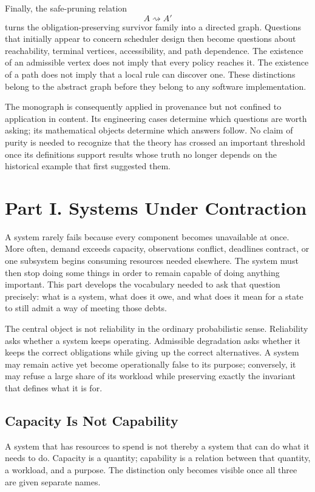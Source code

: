\documentclass[11pt]{report}
\begin{document}
Finally, the safe-pruning relation
\[
A\rightsquigarrow A'
\]
turns the obligation-preserving survivor family into a directed graph.
Questions that initially appear to concern scheduler design then become
questions about reachability, terminal vertices, accessibility, and
path dependence. The existence of an admissible vertex does not imply
that every policy reaches it. The existence of a path does not imply
that a local rule can discover one. These distinctions belong to the
abstract graph before they belong to any software implementation.

The monograph is consequently applied in provenance but not confined to
application in content. Its engineering cases determine which questions
are worth asking; its mathematical objects determine which answers
follow. No claim of purity is needed to recognize that the theory has
crossed an important threshold once its definitions support results
whose truth no longer depends on the historical example that first
suggested them.

\part*{Part I. Systems Under Contraction}

A system rarely fails because every component becomes unavailable at once. More often, demand exceeds capacity, observations conflict, deadlines contract, or one subsystem begins consuming resources needed elsewhere. The system must then stop doing some things in order to remain capable of doing anything important. This part develops the vocabulary needed to ask that question precisely: what is a system, what does it owe, and what does it mean for a state to still admit a way of meeting those debts.

The central object is not reliability in the ordinary probabilistic sense. Reliability asks whether a system keeps operating. Admissible degradation asks whether it keeps the correct obligations while giving up the correct alternatives. A system may remain active yet become operationally false to its purpose; conversely, it may refuse a large share of its workload while preserving exactly the invariant that defines what it is for.

\chapter{Capacity Is Not Capability}

A system that has resources to spend is not thereby a system that can do what it needs to do. Capacity is a quantity; capability is a relation between that quantity, a workload, and a purpose. The distinction only becomes visible once all three are given separate names.
\end{document}
